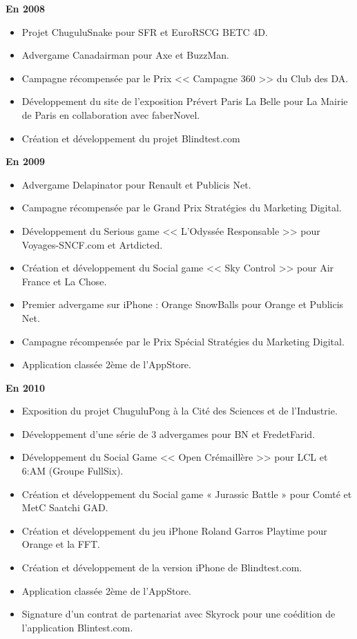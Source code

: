 \textbf{En 2008}

\begin{itemize}
	\item Projet ChuguluSnake pour SFR et EuroRSCG BETC 4D.
	\item Advergame Canadairman pour Axe et BuzzMan.
	\item Campagne récompensée par le Prix << Campagne 360 >> du Club des DA.
	\item Développement du site de l’exposition Prévert Paris La Belle pour La Mairie de Paris en collaboration avec faberNovel.
	\item Création et développement du projet Blindtest.com
\end{itemize}

\textbf{En 2009}

\begin{itemize}
	\item Advergame Delapinator pour Renault et Publicis Net.
	\item Campagne récompensée par le Grand Prix Stratégies du Marketing Digital.
	\item Développement du Serious game << L’Odyssée Responsable >> pour Voyages-SNCF.com et Artdicted.
	\item Création et développement du Social game << Sky Control >> pour Air France et La Chose.
	\item Premier advergame sur iPhone : Orange SnowBalls pour Orange et Publicis Net.
	\item Campagne récompensée par le Prix Spécial Stratégies du Marketing Digital.
	\item Application classée 2ème de l’AppStore.
\end{itemize}

\textbf{En 2010}

\begin{itemize}
	\item Exposition du projet ChuguluPong à la Cité des Sciences et de l’Industrie.
	\item Développement d’une série de 3 advergames pour BN et FredetFarid.
	\item Développement du Social Game << Open Crémaillère >> pour LCL et 6:AM (Groupe FullSix).
	\item Création et développement du Social game « Jurassic Battle » pour Comté et MetC Saatchi GAD.
	\item Création et développement du jeu iPhone Roland Garros Playtime pour Orange et la FFT.
	\item Création et développement de la version iPhone de Blindtest.com.
	\item Application classée 2ème de l’AppStore.
	\item Signature d’un contrat de partenariat avec Skyrock pour une coédition de l’application Blintest.com.
\end{itemize}

